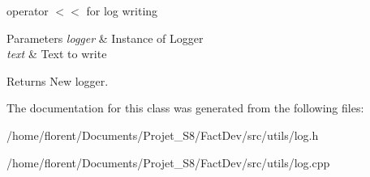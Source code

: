 operator $<$$<$ for log writing 


\begin{DoxyParams}{Parameters}
{\em logger} & Instance of Logger \\
\hline
{\em text} & Text to write \\
\hline
\end{DoxyParams}
\begin{DoxyReturn}{Returns}
New logger. 
\end{DoxyReturn}


The documentation for this class was generated from the following files\-:\begin{DoxyCompactItemize}
\item 
/home/florent/\-Documents/\-Projet\-\_\-\-S8/\-Fact\-Dev/src/utils/log.\-h\item 
/home/florent/\-Documents/\-Projet\-\_\-\-S8/\-Fact\-Dev/src/utils/log.\-cpp\end{DoxyCompactItemize}
